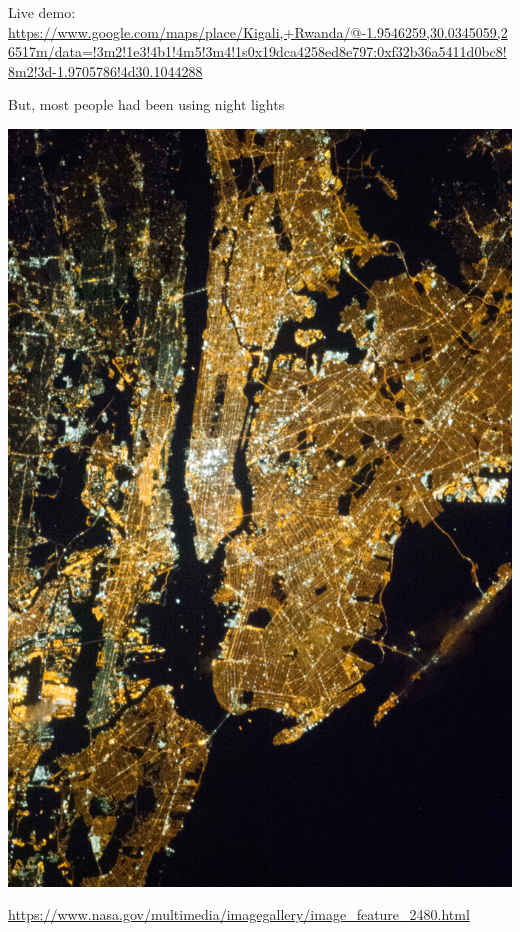 \documentclass[aspectratio=169]{beamer}
\begin{document}
\begin{frame}

Live demo:
\url{https://www.google.com/maps/place/Kigali,+Rwanda/@-1.9546259,30.0345059,26517m/data=!3m2!1e3!4b1!4m5!3m4!1s0x19dca4258ed8e797:0xf32b36a5411d0bc8!8m2!3d-1.9705786!4d30.1044288}

\end{frame}
\begin{frame}

But, most people had been using night lights
\begin{center}
\includegraphics[height=0.7\textheight]{figures/nyc_night}
\end{center}

\vfill
\url{https://www.nasa.gov/multimedia/imagegallery/image_feature_2480.html}
\end{frame}
\end{document}
